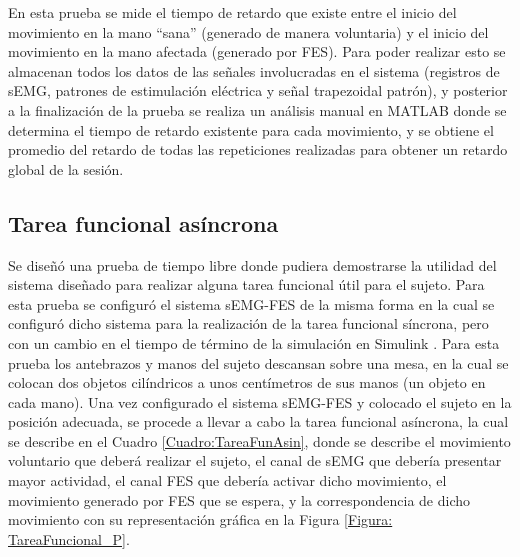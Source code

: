 En esta prueba se mide el tiempo de retardo que existe entre el inicio del movimiento en la mano ``sana'' (generado de manera voluntaria) y el inicio del movimiento en la mano afectada (generado por FES). Para poder realizar esto se almacenan todos los datos de las señales involucradas en el sistema (registros de sEMG, patrones de estimulación eléctrica y señal trapezoidal patrón), y posterior a la finalización de la prueba se realiza un análisis manual en MATLAB\textregistered \; donde se determina el tiempo de retardo existente para cada movimiento, y se obtiene el promedio del retardo de todas las repeticiones realizadas para obtener un retardo global de la sesión.

\subsection{Tarea funcional asíncrona}\label{Sec: TareaFunAsin}

Se diseñó una prueba de tiempo libre donde pudiera demostrarse la utilidad del sistema diseñado para realizar alguna tarea funcional útil para el sujeto. Para esta prueba se configuró el sistema sEMG-FES de la misma forma en la cual se configuró dicho sistema para la realización de la tarea funcional síncrona, pero con un cambio en el tiempo de término de la simulación en Simulink \textregistered . Para esta prueba los antebrazos y manos del sujeto descansan sobre una mesa, en la cual se colocan dos objetos cilíndricos a unos centímetros de sus manos (un objeto en cada mano). Una vez configurado el sistema sEMG-FES y colocado el sujeto en la posición adecuada, se procede a llevar a cabo la tarea funcional asíncrona, la cual se describe en el Cuadro \ref{Cuadro:TareaFunAsin}, donde se describe el movimiento voluntario que deberá realizar el sujeto, el canal de sEMG que debería presentar mayor actividad, el canal FES que debería activar dicho movimiento, el movimiento generado por FES que se espera, y la correspondencia de dicho movimiento con su representación gráfica en la Figura \ref{Figura: TareaFuncional_P}.

